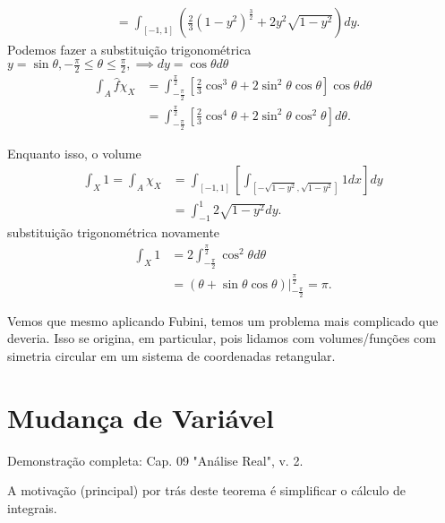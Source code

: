 \begin{eg}
\begin{align*}
	&= \int_{\left[ -1,1 \right] }\left( \frac{2}{3}\left( 1-y^2 \right)^{\frac{3}{2}} + 2y^2\sqrt{1-y^2} \right) dy
    .\end{align*}
    Podemos fazer a substituição trigonométrica $y=\sin \theta, -\frac{\pi}{2}\le \theta \le \frac{\pi}{2}, \implies dy = \cos \theta d\theta$ 
    \begin{align*}
	\int_A \hat{f} \chi_X &= \int_{-\frac{\pi}{2}}^{\frac{\pi}{2}} \left[ \frac{2}{3}\cos^3\theta + 2\sin^2\theta \cos\theta \right] \cos\theta d\theta \\
		 &= \int_{-\frac{\pi}{2}}^{\frac{\pi}{2}} \left[ \frac{2}{3}\cos^4\theta + 2\sin^2\theta \cos^2\theta \right] d\theta
    .\end{align*}

    Enquanto isso, o volume
    \begin{align*}
	\int_X 1 =\int_A \chi_X &= \int_{\left[ -1,1 \right] } \left[ \int_{\left[ -\sqrt{1-y^2} , \sqrt{1-y^2}  \right] } 1 dx \right]  dy \\
				&= \int_{-1 }^1  2\sqrt{1-y^2} dy
    .\end{align*}
    substituição trigonométrica novamente
    \begin{align*}
	\int_X 1 &= 2\int_{-\frac{\pi}{2}}^{\frac{\pi}{2}} \cos^2\theta d\theta \\
	&= \left( \theta + \sin\theta\cos\theta \right)\Big|_{-\frac{\pi}{2}}^{\frac{\pi}{2}} = \pi
    .\end{align*}
\end{eg}

Vemos que mesmo aplicando Fubini, temos um problema mais complicado que deveria. Isso se origina, em particular, pois lidamos com volumes/funções com simetria circular em um sistema de coordenadas retangular.

\section*{Mudança de Variável}

\begin{note}
    Demonstração completa: Cap. 09 "Análise Real", v. 2.
\end{note}

A motivação (principal) por trás deste teorema é simplificar o cálculo de integrais.

